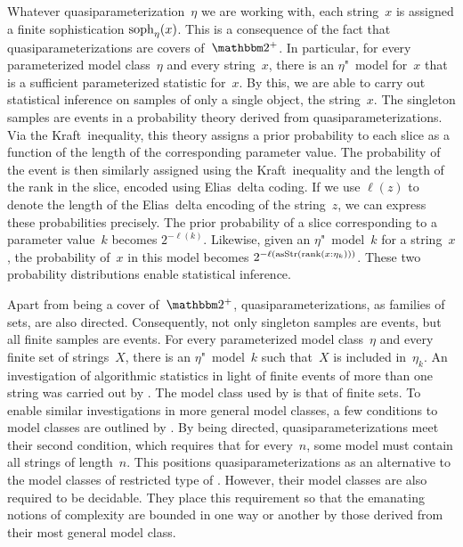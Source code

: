 Whatever quasiparameterization~$\eta$ we are working with, each string~$x$ is assigned a finite sophistication $\operatorname{soph}_\eta(x)$.
This is a consequence of the fact that quasiparameterizations are covers of~$\binary^+$.
In particular, for every parameterized model class~$\eta$ and every string~$x$, there is an $\eta$"~model for~$x$ that is a sufficient parameterized statistic for~$x$.
By this, we are able to carry out statistical inference on samples of only a single object, the string~$x$.
The singleton samples are events in a probability theory derived from quasiparameterizations.
Via the Kraft~inequality, this theory assigns a prior probability to each slice as a function of the length of the corresponding parameter value.
The probability of the event is then similarly assigned using the Kraft~inequality and the length of the rank in the slice, encoded using Elias~delta coding.
If we use $\ell(z)$ to denote the length of the Elias~delta encoding of the string~$z$, we can express these probabilities precisely.
The prior probability of a slice corresponding to a parameter value~$k$ becomes $2^{-\ell(k)}$.
Likewise, given an $\eta$"~model~$k$ for a string~$x$, the probability of~$x$ in this model becomes $2^{-\ell(\operatorname{asStr}(\operatorname{rank}(x : \eta_k)))}$.
These two probability distributions enable statistical inference.

Apart from being a cover of~$\binary^+$, quasiparameterizations, as families of sets, are also directed.
Consequently, not only singleton samples are events, but all finite samples are events.
For every parameterized model class~$\eta$ and every finite set of strings~$X$, there is an $\eta$"~model~$k$ such that~$X$ is included in~$\eta_k$.
An investigation of algorithmic statistics in light of finite events of more than one string was carried out by \textcite{milovanov2016algorithmic}.
The model class used by \citeauthor{milovanov2016algorithmic} is that of finite sets.
To enable similar investigations in more general model classes, a few conditions to model classes are outlined by \textcite[Section~6.1]{vereshchagin2017algorithmic}.
By being directed, quasiparameterizations meet their second condition, which requires that for every~$n$, some model must contain all strings of length~$n$.
This positions quasiparameterizations as an alternative to the model classes of restricted type of \textcite{vereshchagin2017algorithmic}.
However, their model classes are also required to be decidable.
They place this requirement so that the emanating notions of complexity are bounded in one way or another by those derived from their most general model class.

